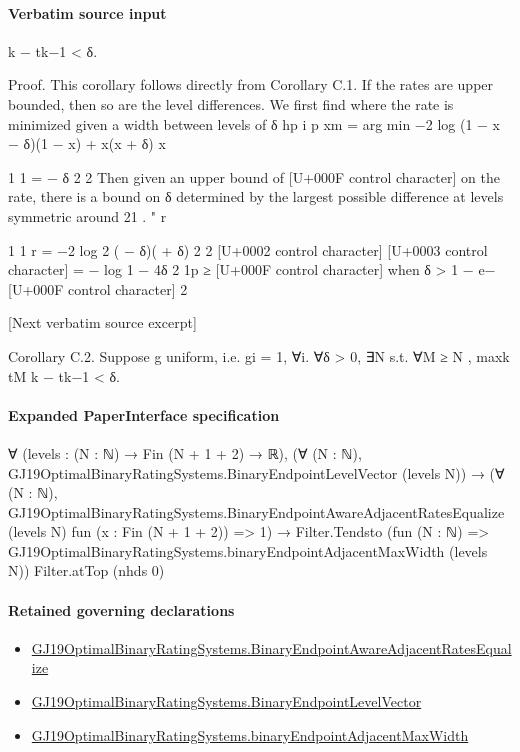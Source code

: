 \documentclass[10pt]{article}
\begin{document}
\paragraph{Verbatim source input}
\begin{ReviewVerbatim}
k − tk−1 < δ.

Proof. This corollary follows directly from Corollary C.1. If the rates are upper bounded, then so
are the level differences.
We first find where the rate is minimized given a width between levels of δ
hp
i
p
xm = arg min −2 log
(1 − x − δ)(1 − x) + x(x + δ)
x

1 1
= − δ
2 2
Then given an upper bound of [U+000F control character] on the rate, there is a bound on δ determined by the largest
possible difference at levels symmetric around 21 .
" r

1
1
r = −2 log 2 ( − δ)( + δ)
2
2
[U+0002 control character]
[U+0003 control character]
= − log 1 − 4δ 2
1p
≥ [U+000F control character] when δ >
1 − e−[U+000F control character]
2


[Next verbatim source excerpt]

Corollary C.2. Suppose g uniform, i.e. gi = 1, ∀i. ∀δ > 0, ∃N s.t. ∀M ≥ N , maxk tM
k − tk−1 < δ.
\end{ReviewVerbatim}



\paragraph{Expanded PaperInterface specification}
\begin{ReviewVerbatim}
∀ (levels : (N : ℕ) → Fin (N + 1 + 2) → ℝ),
  (∀ (N : ℕ), GJ19OptimalBinaryRatingSystems.BinaryEndpointLevelVector (levels N)) →
    (∀ (N : ℕ),
        GJ19OptimalBinaryRatingSystems.BinaryEndpointAwareAdjacentRatesEqualize (levels N) fun (x : Fin (N + 1 + 2)) =>
          1) →
      Filter.Tendsto (fun (N : ℕ) => GJ19OptimalBinaryRatingSystems.binaryEndpointAdjacentMaxWidth (levels N))
        Filter.atTop (nhds 0)
\end{ReviewVerbatim}

\paragraph{Retained governing declarations}
\begin{itemize}\raggedright
\item \hyperlink{governing-declaration-5a62c276eedad684}{GJ19\allowbreak{}Optimal\allowbreak{}Binary\allowbreak{}Rating\allowbreak{}Systems.\allowbreak{}Binary\allowbreak{}Endpoint\allowbreak{}Aware\allowbreak{}Adjacent\allowbreak{}Rates\allowbreak{}Equalize}
\item \hyperlink{governing-declaration-aa797f827cdcda67}{GJ19\allowbreak{}Optimal\allowbreak{}Binary\allowbreak{}Rating\allowbreak{}Systems.\allowbreak{}Binary\allowbreak{}Endpoint\allowbreak{}Level\allowbreak{}Vector}
\item \hyperlink{governing-declaration-94dfb5d60ae8b6f4}{GJ19\allowbreak{}Optimal\allowbreak{}Binary\allowbreak{}Rating\allowbreak{}Systems.\allowbreak{}binary\allowbreak{}Endpoint\allowbreak{}Adjacent\allowbreak{}Max\allowbreak{}Width}
\end{itemize}
\end{document}
